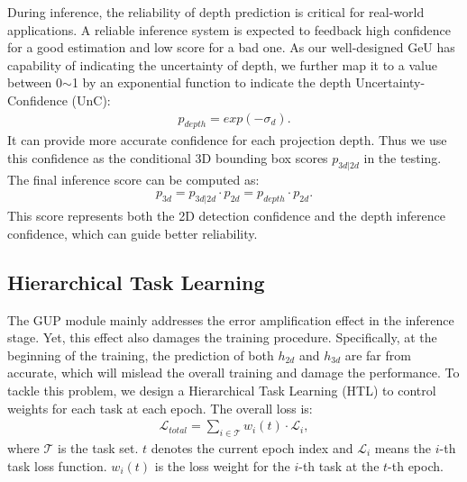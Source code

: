 \documentclass[10pt,twocolumn,letterpaper]{article}
\begin{document}
During inference, the reliability of depth prediction is critical for real-world applications. A reliable inference system is expected to feedback high confidence for a good estimation and low score for a bad one. As our well-designed GeU has capability of indicating the uncertainty of depth, we further map it to a value between 0$\sim$1 by an exponential function to indicate the depth Uncertainty-Confidence (UnC):
\begin{equation}
\label{eq:unc}
\begin{aligned}
     p_{depth} = exp(-\sigma_{d}).
\end{aligned}
\end{equation}
It can provide more accurate confidence for each projection depth. Thus we use this confidence as the conditional 3D bounding box scores $p_{3d|2d}$ in the testing. The final inference score can be computed as:
\begin{equation}
\begin{aligned}
    p_{3d} = p_{3d|2d}\cdot p_{2d} = p_{depth}\cdot p_{2d}.
\end{aligned}    
\end{equation}
This score represents both the 2D detection confidence and the depth inference confidence, which can guide better reliability. 



\subsection{Hierarchical Task Learning}
The GUP module mainly addresses the error amplification effect in the inference stage. Yet, this effect also damages the training procedure. Specifically, at the beginning of the training, the prediction of both $h_{2d}$ and $h_{3d}$ are far from accurate, which will mislead the overall training and damage the performance.  
To tackle this problem, we design a Hierarchical Task Learning (HTL) to control weights for each task at each epoch. The overall loss is:
\begin{equation}
\begin{aligned}
     \mathcal{L}_{total} = \sum_{i\in \mathcal{T}} w_{i}(t)\cdot \mathcal{L}_{i},
\end{aligned}
\end{equation}
where $\mathcal{T}$ is the task set. $t$ denotes the current epoch index and $\mathcal{L}_{i}$ means the $i$-th task loss function. $w_{i}(t)$ is the loss weight for the $i$-th task at the $t$-th epoch.
\end{document}
